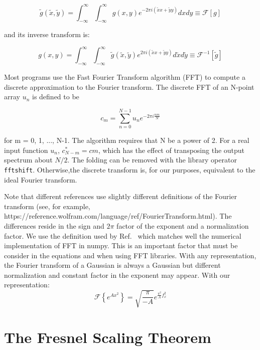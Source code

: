 \documentclass{iucr}              %
\newcommand{\inblue}[1]{{\color{blue}#1}}
\begin{document}
\begin{equation}
\tilde{g}(\tilde{x},\tilde{y}) = \int_{-\infty}^\infty \int_{-\infty}^\infty g(x,y) e^{-2 \pi i (\tilde{x}x + \tilde{y}y)} dx dy \equiv \mathcal{F}[g]
\end{equation}

and its inverse transform is: 

\begin{equation}
g(x,y) = \int_{-\infty}^\infty \int_{-\infty}^\infty \tilde{g}(\tilde{x},\tilde{y}) e^{2 \pi i (\tilde{x}x + \tilde{y}y)} d\tilde{x} d\tilde{y} \equiv \mathcal{F}^{-1}[\tilde{g}]
\end{equation}

Most programs use the Fast Fourier Transform algorithm (FFT) to compute a discrete approximation to the Fourier transform. The discrete FFT of an N-point array
$u_n$ is defined to be

\begin{equation}
 c_m = \sum_{n=0}^{N-1} u_n e^{-2 \pi i \frac{n m}{N}}
\end{equation}

for m = 0, 1, ..., N-1. The algorithm requires that N be a power of 2. For a real input function $u_n$, $c_{N-m}^\ast = cm$, which has the effect of transposing the output spectrum about $N/2$. The folding can be removed with the library operator {\tt fftshift}. Otherwise,the discrete transform is, for our purposes, equivalent to the ideal Fourier transform.

Note that different references use slightly different definitions of the Fourier transform (see, for example, \inblue{https://reference.wolfram.com/language/ref/FourierTransform.html}). The differences reside in the sign and $2 \pi$ factor of the exponent and a normalization factor. We use the definition used by Ref.~\cite{goodmanfourier} which matches well the numerical implementation of FFT in numpy. This is an important factor that must be consider in the equations and when using FFT libraries. With any representation, the Fourier transform of a Gaussian is always a Gaussian but different normalization and constant factor in the exponent may appear. With our representation:
\begin{equation}
\mathcal{F}\left\{ e^{A x^2} \right\} = \sqrt{\frac{\pi}{-A}} e^{\frac{\pi^2}{A} f_x^2}
\end{equation}

\section{The Fresnel Scaling Theorem}
\label{appendix_scaling}
\end{document}
